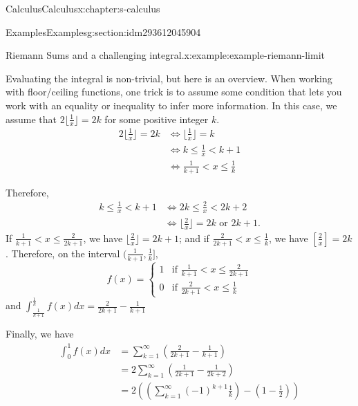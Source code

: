 \documentclass[twoside,10pt,]{book}
\numberwithin{equation}{section}
\newcommand{\lt}{<}
\begin{document}
\begin{chapterptx}{Calculus}{}{Calculus}{}{}{x:chapter:s-calculus}
\begin{sectionptx}{Examples}{}{Examples}{}{}{g:section:idm293612045904}
\begin{example}{Riemann Sums and a challenging integral.}{x:example:example-riemann-limit}
\par
Evaluating the integral is non-trivial, but here is an overview.  When working with floor\slash{}ceiling functions, one trick  is to assume some condition that lets you work with an equality or inequality to infer more information.  In this case, we assume that  \(2\lfloor \frac{1}{x}\rfloor =2k\) for some positive integer \(k\).%
\begin{equation*}
\begin{split}
2\lfloor \frac{1}{x}\rfloor =2k &\Leftrightarrow  \lfloor \frac{1}{x}\rfloor=k\\
& \Leftrightarrow k \leq \frac{1}{x} \lt k +1 \\
& \Leftrightarrow \frac{1}{k+1} \lt x \leq \frac{1}{k}
\end{split}
\end{equation*}
%
\par
Therefore,%
\begin{equation*}
\begin{split}
k \leq \frac{1}{x} \lt k +1  &\Leftrightarrow 2k \leq \frac{2}{x} \lt 2k +2 \\
&\Leftrightarrow  \lfloor \frac{2}{x} \rfloor = 2k \textrm{ or } 2k + 1.
\end{split}
\end{equation*}
If \(\frac{1}{k+1} \lt x \leq \frac{2}{2k+1}\), we have \(\lfloor \frac{2}{x}\rfloor = 2k+1\); and if \(\frac{2}{2k+1} \lt x \leq \frac{1}{k}\), we have \([\frac{2}{x}] = 2k\).  Therefore,  on the interval \((\frac{1}{k+1}, \frac{1}{k}]\),%
\begin{equation*}
f(x)=\begin{cases} 1 & \textrm{if } \frac{1}{k+1} \lt x \leq \frac{2}{2k+1}\\
0 & \textrm{if } \frac{2}{2k+1} \lt x \leq \frac{1}{k}
\end{cases}
\end{equation*}
and \(\int_{\frac{1}{k+1}}^{\frac{1}{k}} f(x) dx = \frac{2}{2k+1}-  \frac{1}{k+1}\)%
\par
Finally, we have%
\begin{equation*}
\begin{split}
\int_{0}^{1} f(x) dx & = \sum_{k=1}^{\infty} \left( \frac{2}{2k+1}-  \frac{1}{k+1} \right) \\
&  = 2 \sum_{k=1}^{\infty} \left( \frac{1}{2k+1} - \frac{1}{2k+2} \right) \\
&  = 2 \left(\left( \sum_{k=1}^{\infty} (-1)^{k+1}\frac{1}{k}\right)  - (1-\frac{1}{2}) \right)\\

\end{split}
\end{equation*}
\end{example}
\end{sectionptx}
\end{chapterptx}
\end{document}
